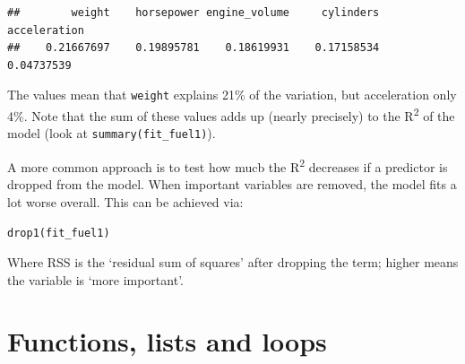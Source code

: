 \documentclass[]{book}
\newenvironment{Shaded}{\begin{snugshade}}{\end{snugshade}}
\newcommand{\CommentTok}[1]{\textcolor[rgb]{0.56,0.35,0.01}{\textit{#1}}}
\newcommand{\DataTypeTok}[1]{\textcolor[rgb]{0.13,0.29,0.53}{#1}}
\newcommand{\KeywordTok}[1]{\textcolor[rgb]{0.13,0.29,0.53}{\textbf{#1}}}
\newcommand{\NormalTok}[1]{#1}
\newcommand{\OperatorTok}[1]{\textcolor[rgb]{0.81,0.36,0.00}{\textbf{#1}}}
\newcommand{\OtherTok}[1]{\textcolor[rgb]{0.56,0.35,0.01}{#1}}
\newcommand{\StringTok}[1]{\textcolor[rgb]{0.31,0.60,0.02}{#1}}
\let\BeginKnitrBlock\begin \let\EndKnitrBlock\end
\begin{document}
\begin{Shaded}
\end{Shaded}

\begin{verbatim}
##        weight    horsepower engine_volume     cylinders  acceleration 
##    0.21667697    0.19895781    0.18619931    0.17158534    0.04737539
\end{verbatim}

The values mean that \texttt{weight} explains 21\% of the variation, but acceleration only 4\%. Note that the sum of these values adds up (nearly precisely) to the R\textsuperscript{2} of the model (look at \texttt{summary(fit\_fuel1)}).

\BeginKnitrBlock{rmdtry}
A more common approach is to test how mucb the R\textsuperscript{2} decreases if a predictor is dropped from the model. When important variables are removed, the model fits a lot worse overall. This can be achieved via:

\texttt{drop1(fit\_fuel1)}

Where RSS is the `residual sum of squares' after dropping the term; higher means the variable is `more important'.
\EndKnitrBlock{rmdtry}

\hypertarget{programming}{%
\chapter{Functions, lists and loops}\label{programming}}
\end{document}

